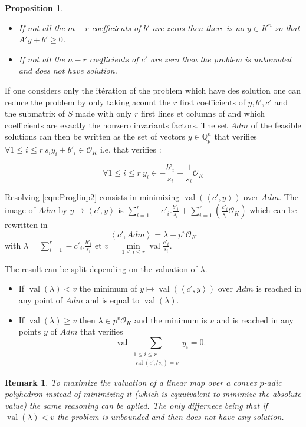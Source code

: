 \documentclass[a4paper,12pt]{article}
\newtheorem{proposition}{Proposition}
\newtheorem{remark}{Remark}
\DeclareMathOperator{\val}{val}
\newcommand{\OK}{\mathcal{O}_K}
\begin{document}
\begin{proposition}
	\begin{itemize}~
		
		\item[$\circ$] If not all the $m-r$ coefficients of $b'$ are zeros then there is no $y \in K ^n$ so that $A'y+b' \ge  0$.
		\item[$\circ$] If not all the $n-r$ coefficients of $c'$ are zero then the problem is unbounded and does not have solution. \end{itemize} 
\end{proposition}
If one considers only the itération of the problem which have des solution one can reduce the problem by only taking acount the $r$ first coefficients of $y, b', c'$ and the submatrix of $S$ made with only $r$ first lines et columns of and which coefficients are exactly the nonzero invariants factors. The set $Adm$ of the feasible solutions can then be written as the set of vectors $y \in \mathbb{Q}_{ p } ^n$ that verifies $\forall 1 \le i\le r \ s_i y_i + b'_i \in \OK$ i.e. that verifies :

\begin{equation}
	\forall 1 \le i\le r  \ y_i \in -\frac{b’_i}{s_i} + \frac{1}{s_i} \OK
\end{equation}


Resolving \ref{eqn:Proglinp2} consists in minimizing $\val\left(\left<c',y \right>\right)$ over $Adm$. The image of $Adm$ by $y \mapsto \left<c',y \right>$ is $\sum_{i=1}^r -c'_i.\frac{b'_i}{s_i} + \sum_{i=1}^r\left( \frac{c'_i}{s_{i}} \OK \right)$ which can be rewritten in 
$$\left<c',Adm \right> = \lambda + p^{v} \OK$$
with $\lambda = \sum\limits_{i=1}^r -c'_i.\frac{b'_i}{s_i}$ et $v = \min\limits_{1\le i\le r} \val \frac{c'_{i}}{s_{i}} $.

The result can be split depending on the valuation of $\lambda$.
\begin{itemize}
	\item If $\val( \lambda) < v$ the minimum of $y\mapsto \val\left(\left<c',y \right>\right)$ over $Adm$ is reached in any point of $Adm$ and is equal to $\val\left( \lambda\right)$.
	\item If $\val\left( \lambda \right) \ge v$ then $\lambda \in p^{v} \OK$ and the minimum is $v $ and is reached in any points $y$ of $Adm$ that verifies 
	$$\val\sum \limits_{\begin{array}{c} 1\le i\le r\\ \val\left(c'_{i}/{s_{i}} \right) = v  \end{array}   } y_{i} = 0.$$ 
	
\end{itemize}
\begin{remark}
	To maximize the valuation of a linear map over a convex $p$-adic polyhedron instead of minimizing it (which is equuivalent to minimize the absolute value) the same reasoning can be aplied. The only differnece being that if $\val\left( \lambda\right) < v$ the problem is unbounded and then does not have any solution. 
\end{remark}
\end{document}
